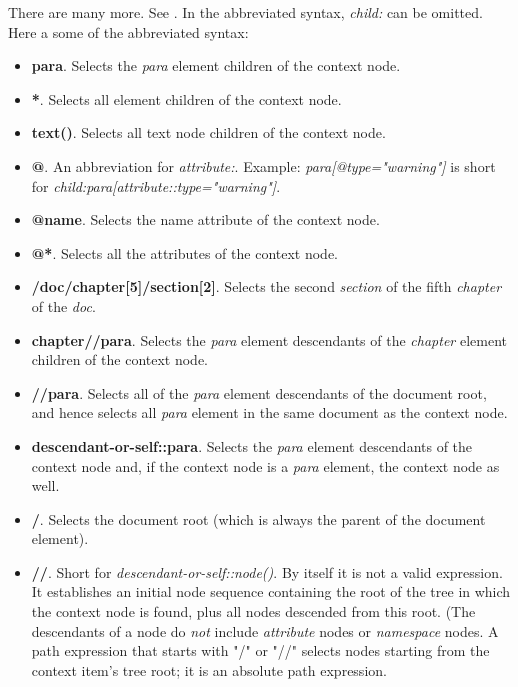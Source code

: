    There are many more. See \cite{xpath1999}.
   In the abbreviated syntax, \textsl{child:} can be omitted.
   Here a some of the abbreviated syntax:

   \begin{itemize}
      \item \textbf{para}.
         Selects the \textsl{para} element children of the context node.
      \item \textbf{*}.
         Selects all element children of the context node.
      \item \textbf{text()}.
         Selects all text node children of the context node.
      \item \textbf{@}.
         An abbreviation for \textsl{attribute:}.
         Example: \textsl{para[@type="warning"]} is short for
         \textsl{child:para[attribute::type="warning"]}.
      \item \textbf{@name}.
         Selects the name attribute of the context node.
      \item \textbf{@*}.
         Selects all the attributes of the context node.
      \item \textbf{/doc/chapter[5]/section[2]}.
         Selects the second \textsl{section} of the
         fifth \textsl{chapter} of the \textsl{doc}.
      \item \textbf{chapter//para}.
         Selects the \textsl{para} element descendants of the
         \textsl{chapter} element children of the context node.
      \item \textbf{//para}.
         Selects all of the \textsl{para} element descendants of the
         document root, and hence selects all
         \textsl{para} element in the same document as
         the context node.
      \item \textbf{descendant-or-self::para}.
         Selects the \textsl{para} element descendants of the context node
         and, if the context node is a \textsl{para} element, the context
         node as well.
      \item \textbf{/}.
         Selects the document root (which is always the parent of the
         document element).
      \item \textbf{//}.
         Short for \textsl{descendant-or-self::node()}.
         By itself it is not a valid expression.
         It establishes an initial node sequence containing the root
         of the tree in which the context node is found, plus all
         nodes descended from this root.
         (The descendants of a node do \textsl{not} include
         \textsl{attribute} nodes or
         \textsl{namespace} nodes.
         A path expression that starts with "/" or "//" selects
         nodes starting from the context item's tree root;
         it is an absolute path expression.
   \end{itemize}

